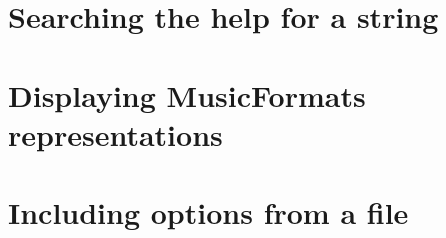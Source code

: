 \section{Searching the help for a string}


\section{Displaying MusicFormats representations}


\section{Including options from a file}



